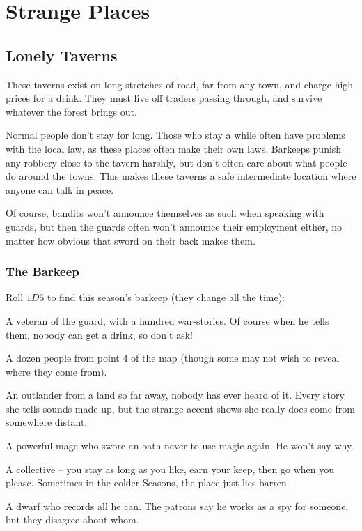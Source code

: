 \section{Strange Places}

\begin{multicols}{2}

\subsection{Lonely Taverns}
\label{lonelyTaverns}

These taverns exist on long stretches of road, far from any town, and
charge high prices for a drink. They must live off traders passing
through, and survive whatever the forest brings out.

Normal people don't stay for long.
Those who stay a while often have problems with the local
law, as these places often make their own laws.
Barkeeps punish any robbery close to the tavern harshly, but don't often care about what people do around the towns.
This makes these taverns a safe intermediate location where anyone can talk in peace.

Of course, bandits won't announce themselves as such when speaking with \glspl{guard}, but then the \glspl{guard} often won't announce their employment either, no matter how obvious that sword on their back makes them.

\subsubsection{The Barkeep}

Roll $1D6$ to find this season's barkeep (they change all the time):

\begin{dlist}
  \item
  A veteran of the \gls{guard}, with a hundred war-stories. Of course
  when he tells them, nobody can get a drink, so don't ask!
  \item
  A dozen people from point 4 of the map (though some may not wish to reveal where they come from).
  \item
  An outlander from a land so far away, nobody has ever heard of it.
  Every story she tells sounds made-up, but the strange accent shows she really does come from somewhere distant.
  \item
  A powerful mage who swore an oath never to use magic again.
  He won't say why.
  \item
  A collective -- you stay as long as you like, earn your keep, then go
  when you please. Sometimes in the colder Seasons, the place just lies
  barren.
  \item
  A dwarf who records all he can.
  The patrons say he works as a spy for someone, but they disagree about whom.
\end{dlist}


\end{multicols}
